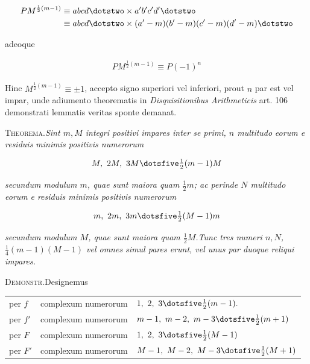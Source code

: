\[
\begin{aligned}
PM^{\frac12(m-1)}&\equiv abcd\dotstwo\times a'b'c'd'\dotstwo\\&\equiv abcd\dotstwo\times(a'-m)(b'-m)(c'-m)(d'-m)\dotstwo
\end{aligned}
\]

adeoque

\[
\begin{aligned}
PM^{\frac12(m-1)}\equiv P(-1)^n
\end{aligned}
\]

Hinc $M^{\frac12(m-1)}\equiv\pm1$, accepto signo superiori vel inferiori, prout $n$ par est vel impar, unde adiumento theorematis in \textit{Disquisitionibus Arithmeticis} art. 106 demonstrati lemmatis veritas sponte demanat.


\textsc{Theorema.}\quad \textit{Sint $m,M$ integri positivi impares inter se primi, $n$ multitudo} \textit{eorum e residuis minimis positivis numerorum}

\[
\begin{aligned}
M,\ 2M,\ 3M\dotsfive\tfrac12(m-1)M
\end{aligned}
\]

\textit{secundum modulum $m$, quae sunt maiora quam $\frac12m$; ac perinde $N$ multitudo eorum} \textit{e residuis minimis positivis numerorum}

\[
\begin{aligned}
m,\ 2m,\ 3m\dotsfive\tfrac12(M-1)m
\end{aligned}
\]

\textit{secundum modulum $M$, quae sunt maiora quam $\frac12M$.\quad Tunc tres numeri $n,N$,} \textit{$\frac14(m-1)(M-1)$ vel omnes simul pares erunt, vel unus par duoque reliqui impares.}

\textsc{Demonstr.}\quad Designemus

{\small
\begin{center}\setlength{\tabcolsep}{3pt}
\begin{tabular}{@{}lll@{}}
per $f$ & complexum numerorum & $1,\ 2,\ 3\dotsfive\frac12(m-1)\mathord{.}$ \\
per $f'$ & complexum numerorum & $m-1,\ m-2,\ m-3\dotsfive\frac12(m+1)$ \\
per $F$ & complexum numerorum & $1,\ 2,\ 3\dotsfive\frac12(M-1)$ \\
per $F'$ & complexum numerorum & $M-1,\ M-2,\ M-3\dotsfive\frac12(M+1)$
\end{tabular}\end{center}
}

